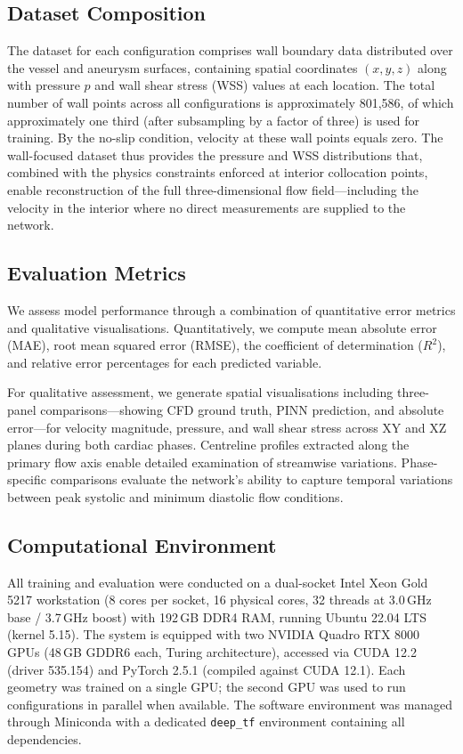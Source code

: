\documentclass[11pt,a4paper]{article}
\begin{document}
\subsection{Dataset Composition}

The dataset for each configuration comprises wall boundary data distributed over the vessel and aneurysm surfaces, containing spatial coordinates $(x, y, z)$ along with pressure $p$ and wall shear stress (WSS) values at each location. The total number of wall points across all configurations is approximately 801{,}586, of which approximately one third (after subsampling by a factor of three) is used for training. By the no-slip condition, velocity at these wall points equals zero. The wall-focused dataset thus provides the pressure and WSS distributions that, combined with the physics constraints enforced at interior collocation points, enable reconstruction of the full three-dimensional flow field---including the velocity in the interior where no direct measurements are supplied to the network.

\subsection{Evaluation Metrics}

We assess model performance through a combination of quantitative error metrics and qualitative visualisations. Quantitatively, we compute mean absolute error (MAE), root mean squared error (RMSE), the coefficient of determination ($R^2$), and relative error percentages for each predicted variable.

For qualitative assessment, we generate spatial visualisations including three-panel comparisons---showing CFD ground truth, PINN prediction, and absolute error---for velocity magnitude, pressure, and wall shear stress across XY and XZ planes during both cardiac phases. Centreline profiles extracted along the primary flow axis enable detailed examination of streamwise variations. Phase-specific comparisons evaluate the network's ability to capture temporal variations between peak systolic and minimum diastolic flow conditions.

\subsection{Computational Environment}

All training and evaluation were conducted on a dual-socket Intel Xeon Gold 5217 workstation (8 cores per socket, 16 physical cores, 32 threads at 3.0\,GHz base / 3.7\,GHz boost) with 192\,GB DDR4 RAM, running Ubuntu 22.04 LTS (kernel 5.15). The system is equipped with two NVIDIA Quadro RTX 8000 GPUs (48\,GB GDDR6 each, Turing architecture), accessed via CUDA 12.2 (driver 535.154) and PyTorch 2.5.1 (compiled against CUDA 12.1). Each geometry was trained on a single GPU; the second GPU was used to run configurations in parallel when available. The software environment was managed through Miniconda with a dedicated \texttt{deep\_tf} environment containing all dependencies.
\end{document}
